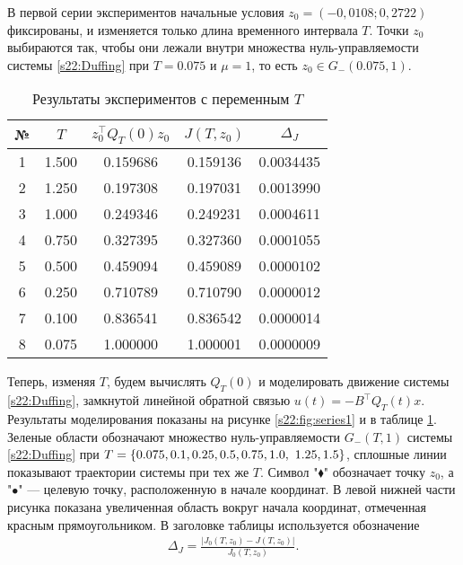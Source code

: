\documentclass[../main.tex]{subfiles}
\begin{document}
В первой серии экспериментов начальные условия $z_0 = (-0,0108; 0,2722)$ 
фиксированы, и изменяется только длина временного интервала $T$.
Точки $z_0 $ выбираются так, чтобы они лежали внутри множества нуль-управляемости системы 
\eqref{s22:Duffing} при $T = 0.075$ и $\mu = 1$, то есть $z_0 \in G_{-}(0.075,1)$.

\begin{table}
\caption{Результаты экспериментов с переменным $T$}
\label{s22:ExampleTable1}
\begin{center}
\begin{tabular}{c|c|c|c|c}
 № & $T$ & $z_0^{\top} Q_T(0) z_0$ & $ J(T,z_0) $ & $ 
 \Delta_J $ \\ \hline 
 1 & 1.500 & 0.159686 & 0.159136 & 0.0034435 \\ \hline
 2 & 1.250 & 0.197308 & 0.197031 & 0.0013990 \\ \hline
 3 & 1.000 & 0.249346 & 0.249231 & 0.0004611 \\ \hline
 4 & 0.750 & 0.327395 & 0.327360 & 0.0001055 \\ \hline
 5 & 0.500 & 0.459094 & 0.459089 & 0.0000102 \\ \hline
 6 & 0.250 & 0.710789 & 0.710790 & 0.0000012 \\ \hline
 7 & 0.100 & 0.836541 & 0.836542 & 0.0000014 \\ \hline
 8 & 0.075 & 1.000000 & 1.000001 & 0.0000009 \\ \hline
\end{tabular}
\end{center}
\end{table}

Теперь, изменяя $T$, будем вычислять $Q_T(0)$ и моделировать движение системы \eqref{s22:Duffing}, замкнутой линейной обратной связью $u(t) = -B^{\top}Q_T(t)x$.
Результаты моделирования показаны на рисунке \ref{s22:fig:series1} и в таблице 
\ref{s22:ExampleTable1}.
Зеленые области обозначают множество нуль-управляемости 
$G_{-}(T,1)$ системы \eqref{s22:Duffing} при $T = \{0.075, 0.1, 0.25, 0.5, 0.75, 1.0,\\\ 1.25, 1.5\}$, сплошные линии показывают траектории системы при тех же $T$. 
Символ "$\blacklozenge$" обозначает точку $z_0$, а "$\bullet$" --- целевую точку, расположенную в начале координат. 
В левой нижней части рисунка показана увеличенная область вокруг начала координат, отмеченная красным прямоугольником.
В заголовке таблицы используется обозначение 
\begin{gather*}
 \Delta_J = \frac{| J_0(T,z_0) - J(T,z_0) |}{J_0(T,z_0)}.
\end{gather*}
\end{document}
